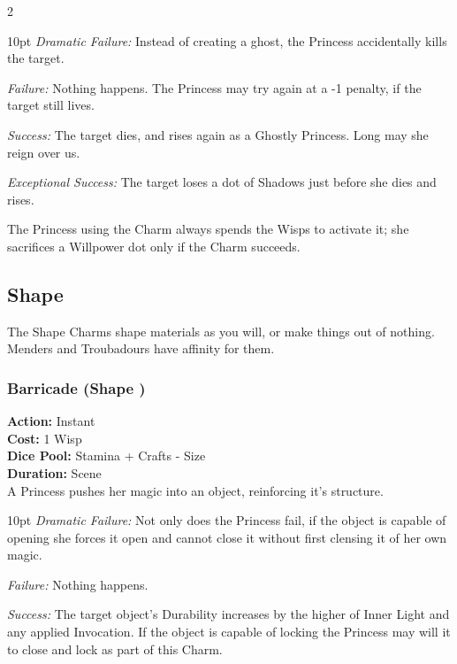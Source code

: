 \begin{multicols}{2}
\begin{myindentpar}{10pt}    \emph{Dramatic Failure:} Instead of creating a ghost, the Princess accidentally kills the target.

    \emph{Failure:} Nothing happens. The Princess may try again at a -1 penalty, if the target still lives.
    
    \emph{Success:} The target dies, and rises again as a Ghostly Princess. Long may she reign over us.
    
    \emph{Exceptional Success:} The target loses a dot of Shadows just before she dies and rises.\end{myindentpar}

The Princess using the Charm always spends the Wisps to activate it; she sacrifices a Willpower dot only if the Charm succeeds.

\subsection*{Shape}
\label{subsec:Shape}
The Shape Charms shape materials as you will, or make things out of nothing. Menders and Troubadours have affinity for them.

\subsubsection*{Barricade (Shape \textbullet)}
\noindent \textbf{Action:} Instant \\

\noindent \textbf{Cost:} 1 Wisp\\

\noindent \textbf{Dice Pool:} Stamina + Crafts - Size\\

\noindent \textbf{Duration:} Scene \\

\noindent A Princess pushes her magic into an object, reinforcing it's structure. 

\begin{myindentpar}{10pt}    \emph{Dramatic Failure:} Not only does the Princess fail, if the object is capable of opening she forces it open and cannot close it without first clensing it of her own magic. 

\emph{Failure:} Nothing happens. 

\emph{Success:} The target object's Durability increases by the higher of Inner Light and any applied Invocation. If the object is capable of locking the Princess may will it to close and lock as part of this Charm.


\end{myindentpar}
\end{multicols}
